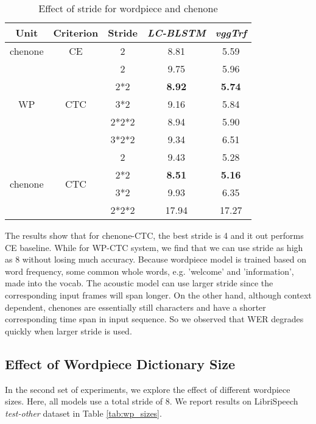 \documentclass[a4paper]{article}
\begin{document}
\begin{table}[htb]
    \centering
    \caption{Effect of stride for wordpiece and chenone}
    \begin{tabular}{|c|c|c|cc|}
    \hline
    Unit & Criterion & Stride & \emph{LC-BLSTM} & \emph{vggTrf} \\
    \hline\hline
    chenone & CE & 2 & 8.81 & 5.59 \\
    \hline
    \multirow{5}{*}{WP} & \multirow{5}{*}{CTC} & 2 & 9.75 & 5.96 \\
     & & 2*2 & \textbf{8.92} & \textbf{5.74} \\
     & & 3*2 & 9.16 & 5.84 \\
     & & 2*2*2 & 8.94 & 5.90 \\
     & & 3*2*2 & 9.34 & 6.51 \\
    \hline
    \multirow{4}{*}{chenone} & \multirow{4}{*}{CTC} & 2 & 9.43 & 5.28 \\
     & & 2*2 & \textbf{8.51} & \textbf{5.16} \\
     & & 3*2 & 9.93 & 6.35 \\
     & & 2*2*2 & 17.94 & 17.27 \\     
    \hline
    \end{tabular}
    \label{tab:stirdes}
\end{table}

The results show that for chenone-CTC, the best stride is 4 and it out performs CE baseline. While for WP-CTC system, we find that we can use stride as high as 8 without losing much accuracy. Because wordpiece model is trained based on word frequency, some common whole words, e.g. 'welcome' and 'information', made into the vocab. The acoustic model can use larger stride since the corresponding input frames will span longer. On the other hand, although context dependent, chenones are essentially still characters and have a shorter corresponding time span in input sequence. So we observed that WER degrades quickly when larger stride is used.

\subsection{Effect of Wordpiece Dictionary Size} 

In the second set of experiments, we explore the effect of different wordpiece sizes. Here, all models use a total stride of 8. We report results on LibriSpeech \emph{test-other} dataset in Table \ref{tab:wp_sizes}.
\end{document}
